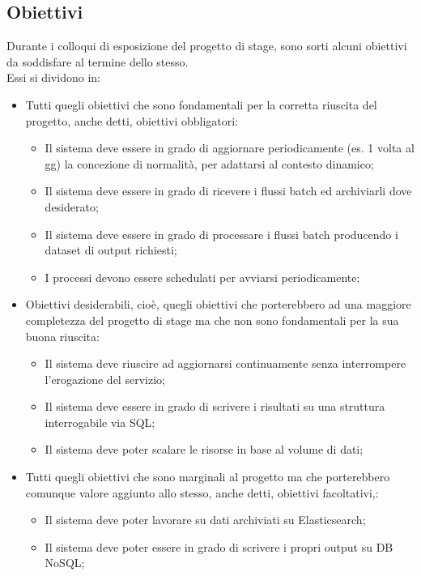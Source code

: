 \subsection{Obiettivi}
Durante i colloqui di esposizione del progetto di stage, sono sorti alcuni obiettivi da soddisfare al termine dello stesso.\\
Essi si dividono in:
\begin{itemize}
	\item Tutti quegli obiettivi che sono fondamentali per la corretta riuscita del progetto, anche detti, obiettivi obbligatori:
	\begin{itemize}
		\item Il sistema deve essere in grado di aggiornare periodicamente (es. 1 volta al gg) la concezione di normalità, per adattarsi al contesto dinamico;	 
		\item Il sistema deve essere in grado di ricevere i flussi batch ed archiviarli dove desiderato;
		\item Il sistema deve essere in grado di processare i flussi batch producendo i dataset di output richiesti;
		\item I processi devono essere schedulati per avviarsi periodicamente;
	\end{itemize}
	\item Obiettivi desiderabili, cioè, quegli obiettivi che porterebbero ad una maggiore completezza del progetto di stage ma che non sono fondamentali per la sua buona riuscita:
		\begin{itemize}
		 \item Il sistema deve riuscire ad aggiornarsi continuamente senza interrompere l'erogazione del servizio;
		 \item Il sistema deve essere in grado di scrivere i risultati su una struttura interrogabile via SQL;
		 \item Il sistema deve poter scalare le risorse in base al volume di dati;
		\end{itemize}	
	\item Tutti quegli obiettivi che sono marginali al progetto ma che porterebbero comunque valore aggiunto allo stesso, anche detti, obiettivi facoltativi,:
	\begin{itemize}
		\item Il sistema deve poter lavorare su dati archiviati su Elasticsearch;
		\item Il sistema deve poter essere in grado di scrivere i propri output su DB NoSQL; 
	\end{itemize}
\end{itemize}
